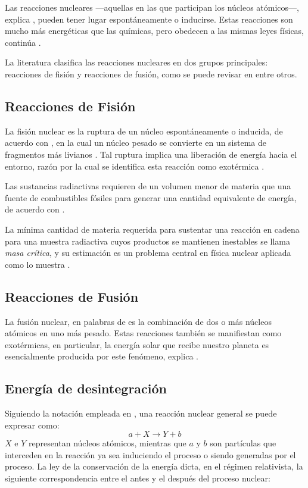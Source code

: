 Las reacciones nucleares —aquellas en las que participan los núcleos atómicos—, explica \cite{Murray.2020}, pueden tener lugar espontáneamente o inducirse. Estas reacciones son mucho más energéticas que las químicas, pero obedecen a las mismas leyes físicas, continúa \cite{Murray.2020}. 

La literatura clasifica las reacciones nucleares en dos grupos principales: reacciones de fisión y reacciones de fusión, como se puede revisar en \cite{Basdevant.2005, Cottingham.2001, Krane.1987, Murray.2020} entre otros.

\subsection{Reacciones de Fisión}
La fisión nuclear es la ruptura de un núcleo espontáneamente o inducida, de acuerdo con \cite{Basdevant.2005}, en la cual un núcleo pesado se convierte en un sistema de fragmentos más livianos \cite{Murray.2020}. Tal ruptura implica una liberación de energía hacia el entorno, razón por la cual se identifica esta reacción como exotérmica \cite{Basdevant.2005, Murray.2020}. 

Las sustancias radiactivas requieren de un volumen menor de materia que una fuente de combustibles fósiles para generar una cantidad equivalente de energía, de acuerdo con \cite{Sanctis.2016}. 

La mínima cantidad de materia requerida para sustentar una reacción en cadena para una muestra radiactiva cuyos productos se mantienen inestables se llama \textit{masa crítica}, y su estimación es un problema central en física nuclear aplicada como lo muestra \cite{MoralesBolio.1974}. 

\subsection{Reacciones de Fusión}
La fusión nuclear, en palabras de \cite{Murray.2020} es la combinación de dos o más núcleos atómicos en uno más pesado. Estas reacciones también se manifiestan como exotérmicas, en particular, la energía solar que recibe nuestro planeta es esencialmente producida por este fenómeno, explica \cite{Basdevant.2005}. 
\iffalse
\subsection{Energía de desintegración}
Siguiendo la notación empleada en \cite{Krane.1987}, una reacción nuclear general se puede expresar como:
\begin{equation*}
  a + X \longrightarrow Y + b  
\end{equation*}
$X$ e $Y$ representan núcleos atómicos, mientras que $a$ y $b$ son partículas que interceden en la reacción ya sea induciendo el proceso o siendo generadas por el proceso. La ley de la conservación de la energía dicta, en el régimen relativista, la siguiente correspondencia entre el antes y el después del proceso nuclear:

